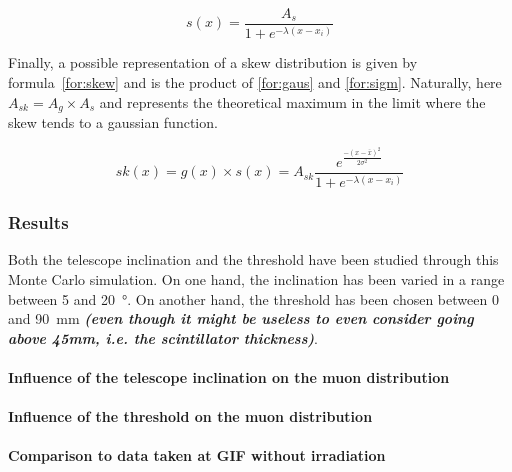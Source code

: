 			\begin{center}
				\begin{equation}
				\label{for:sigm}
					s(x) = \frac{A_s}{1+e^{-\lambda(x-x_i)}}
				\end{equation}
			\end{center}
			
		Finally, a possible representation of a skew distribution is given by formula~\ref{for:skew} and is the product of \ref{for:gaus} and \ref{for:sigm}. Naturally, here $A_{sk} = A_g \times A_s$ and represents the theoretical maximum in the limit where the skew tends to a gaussian function.
			
			\begin{center}
				\begin{equation}
				\label{for:skew}
					sk(x) = g(x)\times s(x) = A_{sk}\frac{e^{\frac{-(x-\bar{x})^2}{2\sigma^2}}}{1+e^{-\lambda(x-x_i)}}
				\end{equation}
			\end{center}
			
		\subsubsection{Results}
		\label{sssec:SimRes}
		
			Both the telescope inclination and the threshold have been studied through this Monte Carlo simulation. On one hand, the inclination has been varied in a range between \SI{5}{} and \SI{20}{\degree}. On another hand, the threshold has been chosen between \SI{0}{} and \SI{90}{mm} \textit{\textbf{(even though it might be useless to even consider going above 45mm, i.e. the scintillator thickness)}}.
		
			\paragraph{Influence of the telescope inclination on the muon distribution}
			
				
			
			\paragraph{Influence of the threshold on the muon distribution}
			
			\paragraph{Comparison to data taken at GIF without irradiation}
		
